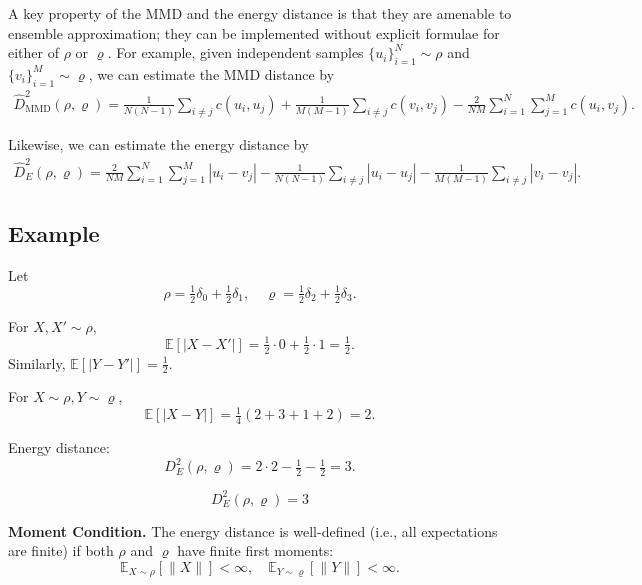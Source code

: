 \documentclass[twoside,11pt]{article}
\begin{document}
A key property of the MMD and the energy distance is that they are amenable to ensemble approximation; they can be implemented without explicit formulae for either of $\rho$ or $\varrho$. For example, given independent samples $\{u_i\}_{i=1}^{N} \sim \rho$ and $\{v_i\}_{i=1}^{M} \sim \varrho$, we can estimate the MMD distance by
\begin{equation}
\begin{aligned}
    \widehat{D}^2_{\mathrm{MMD}}(\rho, \varrho) = \frac{1}{N(N-1)} \sum_{i \ne j} c(u_i, u_j)
    + \frac{1}{M(M-1)} \sum_{i \ne j} c(v_i, v_j)
    - \frac{2}{NM} \sum_{i=1}^{N} \sum_{j=1}^{M} c(u_i, v_j).
\end{aligned}
\tag{12.9}
\end{equation}

Likewise, we can estimate the energy distance by
\begin{equation}
\begin{aligned}
    \widehat{D}^2_E(\rho, \varrho) = \frac{2}{NM} \sum_{i=1}^{N} \sum_{j=1}^{M} |u_i - v_j|
    - \frac{1}{N(N-1)} \sum_{i \ne j} |u_i - u_j|
    - \frac{1}{M(M-1)} \sum_{i \ne j} |v_i - v_j|.
\end{aligned}
\tag{12.10}
\end{equation}

\subsection*{Example}







Let
\[
\rho = \tfrac{1}{2} \delta_0 + \tfrac{1}{2} \delta_1, \quad 
\varrho = \tfrac{1}{2} \delta_2 + \tfrac{1}{2} \delta_3.
\]

For \(X, X' \sim \rho\),
\[
\mathbb{E}[|X - X'|] = \tfrac{1}{2} \cdot 0 + \tfrac{1}{2} \cdot 1 = \tfrac{1}{2}.
\]
Similarly, \(\mathbb{E}[|Y - Y'|] = \tfrac{1}{2}\).

For \(X \sim \rho, Y \sim \varrho\),
\[
\mathbb{E}[|X - Y|] = \tfrac{1}{4}(2 + 3 + 1 + 2) = 2.
\]

Energy distance:
\[
D_E^2(\rho, \varrho) = 2 \cdot 2 - \tfrac{1}{2} - \tfrac{1}{2} = 3.
\]

\[
\boxed{D_E^2(\rho, \varrho) = 3}
\]


\textbf{Moment Condition.} The energy distance is well-defined (i.e., all expectations are finite) if both \(\rho\) and \(\varrho\) have finite first moments:
\[
\mathbb{E}_{X \sim \rho}[\|X\|] < \infty, \quad \mathbb{E}_{Y \sim \varrho}[\|Y\|] < \infty.
\]
\end{document}
